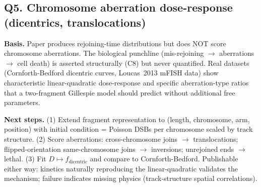 \subsection*{Q5. Chromosome aberration dose-response (dicentrics, translocations)}

\textbf{Basis.} Paper produces rejoining-time distributions but does NOT score
chromosome aberrations. The biological punchline (mis-rejoining $\to$ aberrations $\to$
cell death) is asserted structurally (C8) but never quantified. Real datasets
(Cornforth-Bedford dicentric curves, Loucas~2013 mFISH data) show characteristic
linear-quadratic dose-response and specific aberration-type ratios that a
two-fragment Gillespie model should predict without additional free parameters.

\textbf{Next steps.} (1) Extend fragment representation to (length, chromosome, arm,
position) with initial condition = Poisson DSBs per chromosome scaled by track
structure. (2) Score aberrations: cross-chromosome joins $\to$ translocations;
flipped-orientation same-chromosome joins $\to$ inversions; unrejoined ends $\to$
lethal. (3) Fit $D \mapsto f_{\text{dicentric}}$ and compare to Cornforth-Bedford.
Publishable either way: kinetics naturally reproducing the linear-quadratic validates
the mechanism; failure indicates missing physics (track-structure spatial correlations).

